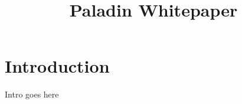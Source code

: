 \documentclass[conference,compsoc,onecolumn]{IEEEtran}
\date{}
\author{}
\begin{document}
\title{Paladin Whitepaper}

\maketitle


\begin{abstract}
\end{abstract}

\section{Introduction}

Intro goes here
% 
% 
% 






\appendices
% 
\end{document}
